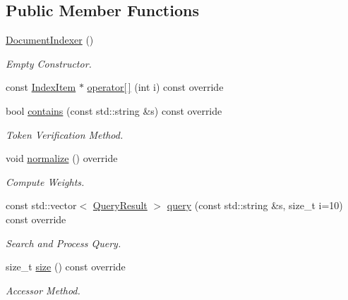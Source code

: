 \subsection*{Public Member Functions}
\begin{DoxyCompactItemize}
\item 
\mbox{\label{class_document_indexer_a44f3c39ee50c32c0226fe98a66f71d07}} 
\hyperlink{class_document_indexer_a44f3c39ee50c32c0226fe98a66f71d07}{Document\+Indexer} ()
\begin{DoxyCompactList}\small\item\em Empty Constructor. \end{DoxyCompactList}\item 
const \hyperlink{class_index_item}{Index\+Item} $\ast$ \hyperlink{class_document_indexer_a46bad198e100cc62dbc8f52ecc2acfeb}{operator\mbox{[}$\,$\mbox{]}} (int i) const override
\item 
bool \hyperlink{class_document_indexer_a4bd5fd7be55de9932933dd6f7bfa7d9f}{contains} (const std\+::string \&s) const override
\begin{DoxyCompactList}\small\item\em Token Verification Method. \end{DoxyCompactList}\item 
void \hyperlink{class_document_indexer_a5e0aeb92576847e9462670693cb0737c}{normalize} () override
\begin{DoxyCompactList}\small\item\em Compute Weights. \end{DoxyCompactList}\item 
const std\+::vector$<$ \hyperlink{class_query_result}{Query\+Result} $>$ \hyperlink{class_document_indexer_af14be24c72be4b3eb165da9c504ec7d1}{query} (const std\+::string \&s, size\+\_\+t i=10) const override
\begin{DoxyCompactList}\small\item\em Search and Process Query. \end{DoxyCompactList}\item 
size\+\_\+t \hyperlink{class_document_indexer_a0c5ab06e1506acc9bbc950e5c563e278}{size} () const override
\begin{DoxyCompactList}\small\item\em Accessor Method. \end{DoxyCompactList}\end{DoxyCompactItemize}
